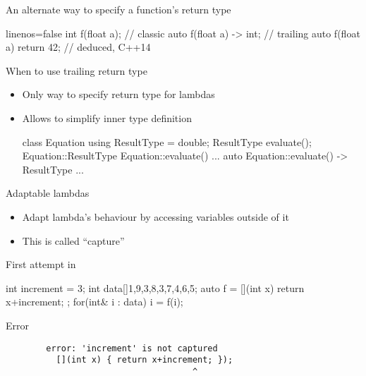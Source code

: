 \begin{frame}[fragile]
  \begin{block}{An alternate way to specify a function's return type}
    \begin{cppcode*}{linenos=false}
      int f(float a);                // classic
      auto f(float a) -> int;        // trailing
      auto f(float a) { return 42; } // deduced, C++14
    \end{cppcode*}
  \end{block}
  \pause
  \begin{block}{When to use trailing return type}
    \begin{itemize}
    \item Only way to specify return type for lambdas
    \item Allows to simplify inner type definition
      \begin{cppcode*}{}
        class Equation {
          using ResultType = double;
          ResultType evaluate();
        }
        Equation::ResultType Equation::evaluate() {...}
        auto Equation::evaluate() -> ResultType {...}
      \end{cppcode*}
    \end{itemize}
  \end{block}
\end{frame}

\begin{frame}[fragile]
  \begin{block}{Adaptable lambdas}
    \begin{itemize}
      \item Adapt lambda's behaviour by accessing variables outside of it
      \item This is called ``capture''
    \end{itemize}
  \end{block}
  \pause
  \begin{block}{First attempt in \cpp}
    \begin{cppcode}
      int increment = 3;
      int data[]{1,9,3,8,3,7,4,6,5};
      auto f = [](int x) { return x+increment; };
      for(int& i : data) i = f(i);
    \end{cppcode}
  \end{block}
  \pause
  \begin{alertblock}{Error}
    \begin{verbatim}
        error: 'increment' is not captured
          [](int x) { return x+increment; });
                                     ^
    \end{verbatim}
  \end{alertblock}
\end{frame}

